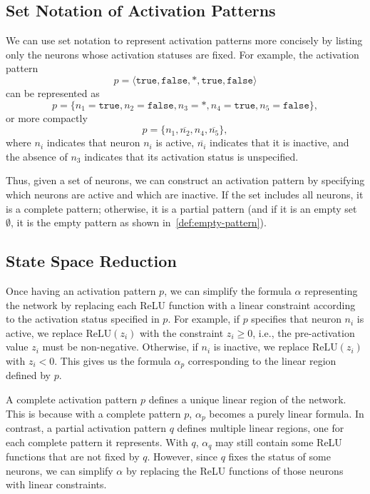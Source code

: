 \documentclass[oneside,11pt,dvipsnames]{book}
\numberwithin{equation}{section}
\theoremstyle{definition}
\theoremstyle{remark}
\newcommand{\relu}[1]{\mathrm{ReLU}\left(#1\right)}
\begin{document}
\subsection{Set Notation of Activation Patterns}\label{sec:pattern-notation}
We can use set notation to represent activation patterns more concisely by listing only the neurons whose activation statuses are fixed.
For example, the activation pattern
\[p = \langle \texttt{true}, \texttt{false}, *, \texttt{true}, \texttt{false} \rangle\]
can be represented as
\[p = \{ n_1 = \texttt{true}, n_2 = \texttt{false}, n_3 = *, n_4 = \texttt{true}, n_5 = \texttt{false} \},\]
or more compactly
\[
p = \{n_1, \overline{n_2}, n_4, \overline{n_5}\},
\]
where $n_i$ indicates that neuron $n_i$ is active, $\overline{n_i}$ indicates that it is inactive, and the absence of $n_3$ indicates that its activation status is unspecified.

Thus, given a set of neurons, we can construct an activation pattern by specifying which neurons are active and which are inactive. If the set includes all neurons, it is a complete pattern; otherwise, it is a partial pattern (and if it is an empty set $\emptyset$, it is the empty pattern as shown in~\autoref{def:empty-pattern}).


\subsection{State Space Reduction}\label{sec:pattern-reduction}
Once having an activation pattern $p$, we can simplify the formula $\alpha$ representing the network by replacing each ReLU function with a linear constraint according to the activation status specified in $p$. For example, if $p$ specifies that neuron $n_i$ is active, we replace $\relu{z_i}$ with the constraint $z_i \ge 0$, i.e., the pre-activation value $z_i$ must be non-negative. Otherwise, if $n_i$ is inactive, we replace $\relu{z_i}$ with $z_i < 0$.
This gives us the formula $\alpha_p$ corresponding to the linear region defined by $p$.

A complete activation pattern $p$ defines a unique linear region of the network. This is because with a complete pattern $p$, $\alpha_p$ becomes a purely linear formula.
In contrast, a partial activation pattern $q$ defines multiple linear regions, one for each complete pattern it represents.  With $q$, $\alpha_q$ may still contain some ReLU functions that are not fixed by $q$.  However, since $q$ fixes the status of some neurons, we can simplify $\alpha$ by replacing the ReLU functions of those neurons with linear constraints.
\end{document}
